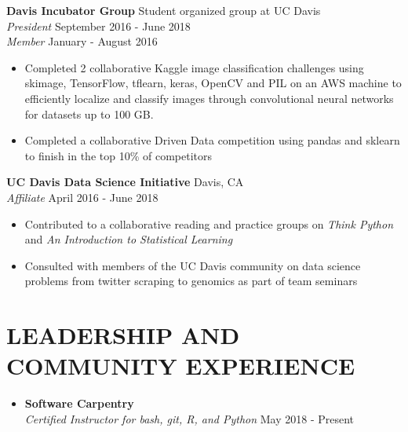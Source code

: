 \documentclass[line,margin,10pt]{res}
\begin{document}
\begin{resume}
\textbf{Davis Incubator Group} \hfill Student organized group at UC Davis\\
{\sl President} \hfill September 2016 - June 2018\\
{\sl Member} \hfill January - August 2016 
\begin{itemize} \itemsep -2pt
\item Completed 2 collaborative Kaggle image classification challenges using skimage, TensorFlow, tflearn, keras, OpenCV and PIL on an AWS machine to efficiently localize and classify images through convolutional neural networks for datasets up to 100 GB.
\item Completed a collaborative Driven Data competition using pandas and sklearn to finish in the top 10\% of competitors
\end{itemize}

\textbf{UC Davis Data Science Initiative} \hfill  Davis, CA \\
{\sl Affiliate} \hfill April 2016 - June 2018
\begin{itemize} \itemsep -2pt
\item Contributed to a collaborative reading and practice groups on {\sl Think Python} and {\sl An Introduction to Statistical Learning} 
\item Consulted with members of the UC Davis community on data science problems from twitter scraping to genomics as part of team seminars
\end{itemize}
 
\section{LEADERSHIP AND COMMUNITY EXPERIENCE}
\begin{itemize}\itemsep -2pt

\item [] \textbf{Software Carpentry} \\ {\sl Certified Instructor for bash, git, R, and Python} \hfill May 2018 - Present


\end{itemize}
\end{resume}
\end{document}
